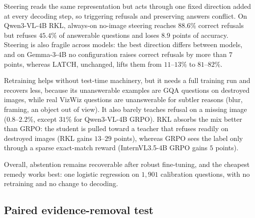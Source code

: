 Steering reads the same representation but acts through one fixed direction added at every
decoding step, so triggering refusals and preserving answers conflict. On Qwen3-VL-4B RKL,
always-on no-image steering reaches $88.6\%$ correct refusals but refuses $45.4\%$ of
answerable questions and loses $8.9$ points of accuracy. Steering is also fragile across
models: the best direction differs between models, and on Gemma-3-4B no configuration
raises correct refusals by more than $7$ points, whereas LATCH, unchanged, lifts
them from $11$--$13\%$ to $81$--$82\%$.

Retraining helps without test-time machinery, but it needs a full training run and
recovers less, because its unanswerable examples are GQA questions on destroyed images,
while real VizWiz questions are unanswerable for subtler reasons (blur, framing, an object
out of view). It also barely teaches refusal on a missing image ($0.8$--$2.2\%$, except
$31\%$ for Qwen3-VL-4B GRPO). RKL absorbs the mix better than GRPO: the student is pulled
toward a teacher that refuses readily on destroyed images (RKL gains $13$--$29$ points),
whereas GRPO sees the label only through a sparse exact-match reward (InternVL3.5-4B GRPO
gains $5$ points).

Overall, abstention remains recoverable after robust fine-tuning, and the cheapest remedy
works best: one logistic regression on $1{,}901$ calibration questions, with no retraining
and no change to decoding.
\subsection{Paired evidence-removal test}
\label{sec:paired_results}

